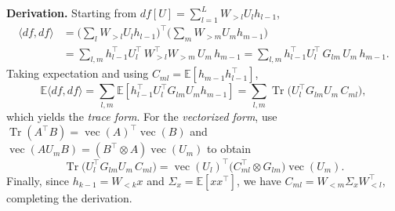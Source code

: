 \documentclass{article}
\theoremstyle{definition}
\begin{document}
\noindent\textbf{Derivation.}
Starting from $df[U]=\sum_{l=1}^L W_{>l}U_l h_{l-1}$,
\[
\begin{aligned}
\langle df,df\rangle
&= \Big(\sum_{l} W_{>l}U_l h_{l-1}\Big)^\top
   \Big(\sum_{m} W_{>m}U_m h_{m-1}\Big) \\
&= \sum_{l,m} h_{l-1}^\top U_l^\top\, W_{>l}^\top W_{>m}\, U_m\, h_{m-1}
= \sum_{l,m} h_{l-1}^\top U_l^\top\, G_{lm}\, U_m\, h_{m-1}.
\end{aligned}
\]
Taking expectation and using $C_{ml}=\mathbb{E}[h_{m-1}h_{l-1}^\top]$,
\[
\mathbb{E}\langle df,df\rangle
= \sum_{l,m}\mathbb{E}\!\left[h_{l-1}^\top U_l^\top G_{lm} U_m h_{m-1}\right]
= \sum_{l,m}\operatorname{Tr}\!\big(U_l^\top G_{lm} U_m\, C_{ml}\big),
\]
which yields the \emph{trace form}. For the \emph{vectorized form}, use
$\operatorname{Tr}(A^\top B)=\operatorname{vec}(A)^\top\operatorname{vec}(B)$ and
$\operatorname{vec}(A U_m B)=(B^\top\!\otimes A)\operatorname{vec}(U_m)$ to obtain
\[
\operatorname{Tr}\!\big(U_l^\top G_{lm} U_m\, C_{ml}\big)
= \operatorname{vec}(U_l)^\top \big(C_{ml}^\top\!\otimes G_{lm}\big)\operatorname{vec}(U_m).
\]
Finally, since $h_{k-1}=W_{<k}x$ and $\Sigma_x=\mathbb{E}[xx^\top]$, we have
$C_{ml}=W_{<m}\Sigma_x W_{<l}^\top$, completing the derivation.
\\
\\
\end{document}

